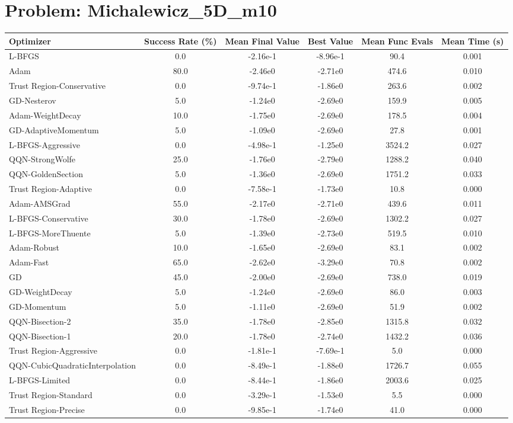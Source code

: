 \documentclass{article}
\begin{document}
\section{Problem: Michalewicz\_5D\_m10}
\begin{longtable}{p{3cm}*{5}{c}}
\toprule
\textbf{Optimizer} & \textbf{Success Rate (\%)} & \textbf{Mean Final Value} & \textbf{Best Value} & \textbf{Mean Func Evals} & \textbf{Mean Time (s)} \\
\midrule
L-BFGS & 0.0 & -2.16e-1 & -8.96e-1 & 90.4 & 0.001 \\
Adam & 80.0 & -2.46e0 & -2.71e0 & 474.6 & 0.010 \\
Trust Region-Conservative & 0.0 & -9.74e-1 & -1.86e0 & 263.6 & 0.002 \\
GD-Nesterov & 5.0 & -1.24e0 & -2.69e0 & 159.9 & 0.005 \\
Adam-WeightDecay & 10.0 & -1.75e0 & -2.69e0 & 178.5 & 0.004 \\
GD-AdaptiveMomentum & 5.0 & -1.09e0 & -2.69e0 & 27.8 & 0.001 \\
L-BFGS-Aggressive & 0.0 & -4.98e-1 & -1.25e0 & 3524.2 & 0.027 \\
QQN-StrongWolfe & 25.0 & -1.76e0 & -2.79e0 & 1288.2 & 0.040 \\
QQN-GoldenSection & 5.0 & -1.36e0 & -2.69e0 & 1751.2 & 0.033 \\
Trust Region-Adaptive & 0.0 & -7.58e-1 & -1.73e0 & 10.8 & 0.000 \\
Adam-AMSGrad & 55.0 & -2.17e0 & -2.71e0 & 439.6 & 0.011 \\
L-BFGS-Conservative & 30.0 & -1.78e0 & -2.69e0 & 1302.2 & 0.027 \\
L-BFGS-MoreThuente & 5.0 & -1.39e0 & -2.73e0 & 519.5 & 0.010 \\
Adam-Robust & 10.0 & -1.65e0 & -2.69e0 & 83.1 & 0.002 \\
Adam-Fast & 65.0 & -2.62e0 & -3.29e0 & 70.8 & 0.002 \\
GD & 45.0 & -2.00e0 & -2.69e0 & 738.0 & 0.019 \\
GD-WeightDecay & 5.0 & -1.24e0 & -2.69e0 & 86.0 & 0.003 \\
GD-Momentum & 5.0 & -1.11e0 & -2.69e0 & 51.9 & 0.002 \\
QQN-Bisection-2 & 35.0 & -1.78e0 & -2.85e0 & 1315.8 & 0.032 \\
QQN-Bisection-1 & 20.0 & -1.78e0 & -2.74e0 & 1432.2 & 0.036 \\
Trust Region-Aggressive & 0.0 & -1.81e-1 & -7.69e-1 & 5.0 & 0.000 \\
QQN-CubicQuadraticInterpolation & 0.0 & -8.49e-1 & -1.88e0 & 1726.7 & 0.055 \\
L-BFGS-Limited & 0.0 & -8.44e-1 & -1.86e0 & 2003.6 & 0.025 \\
Trust Region-Standard & 0.0 & -3.29e-1 & -1.53e0 & 5.5 & 0.000 \\
Trust Region-Precise & 0.0 & -9.85e-1 & -1.74e0 & 41.0 & 0.000 \\
\bottomrule
\end{longtable}
\end{document}
